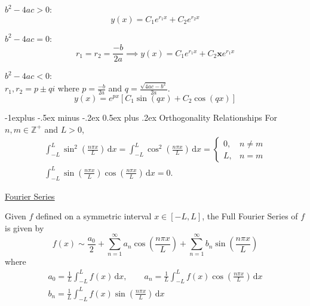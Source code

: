 \documentclass[10pt,landscape,letterpaper]{article}
\makeatletter
\renewcommand{\subsection}{\@startsection{subsection}{2}{0mm}%
                                {-1explus -.5ex minus -.2ex}%
                                {0.5ex plus .2ex}%
                                {\normalfont\normalsize\bfseries}}
\newcommand\cheatsheetmargin{0.2cm}
\makeatother
\begin{document}
\begin{multicols}{3}
\begin{description}[style=unboxed,leftmargin=\cheatsheetmargin]
    \item[Case 1.] $b^2 - 4ac > 0$:
    \begin{equation*}
    \boxed{y(x) = C_1 e^{r_1 x} + C_2 e^{r_2 x}}
    \end{equation*}
    \item[Case 2.] $b^2 - 4ac =0$:\\
    \begin{equation*}
    r_1 = r_2 = \frac{-b}{2a} \implies \boxed{y(x) = C_1 e^{r_1 x} + C_2 \mathbf{x}e^{r_1 x}}
    \end{equation*}
    \item[Case 3.] $b^2 - 4ac < 0$:\\
    $r_1, r_2 = p \pm qi$ where $p = \frac{-b}{2a}$ and $q = \frac{\sqrt{4ac - b^2 }}{2a}$. 
    \begin{equation*}
    \boxed{
        y(x) = e^{px} \left[C_1 \sin \left(qx\right) + C_2 \cos \left(qx\right) \right]
    }
    \end{equation*}
\end{description}

\subsection{Orthogonality Relationships}
For $n,m \in \mathbb{Z}^+$ and $L>0$,
\begin{gather*}
     \int_{-L}^{L} \sin^2 \left(\frac{n\pi x}{L}\right)\, \mathrm{d} x 
     = \int_{-L}^{L} \cos^2 \left(\frac{n\pi x}{L}\right)\, \mathrm{d} x = \begin{cases}
         0, & n \neq m\\
         L, & n = m
     \end{cases}\\
      \int_{-L}^{L} \sin \left(\frac{n\pi x}{L}\right) \cos \left(\frac{n\pi x}{L}\right) \, \mathrm{d} x = 0.
\end{gather*}


\begin{center}
    \Large{\underline{Fourier Series}} \\
\end{center}
Given $f$ defined on a symmetric interval $x\in[-L, L]$, the Full Fourier Series of $f$ is given by
\begin{equation*}\boxed{
f(x) \sim \frac{a_0}{2} + \sum_{n=1}^{\infty} a_n \cos \left(\frac{n\pi x}{L}\right) + \sum_{n=1}^{\infty} b_n \sin \left(\frac{n\pi x}{L}\right)}
\end{equation*}
where
\begin{gather*}
a_0 = \frac{1}{L}\int_{-L}^{L} f(x) \, \mathrm{d}x, \qquad 
a_n = \frac{1}{L}\int_{-L}^{L} f(x) \cos \left(\frac{n\pi x}{L}\right)\, \mathrm{d}x \\
b_n = \frac{1}{L}\int_{-L}^{L} f(x) \sin \left(\frac{n\pi x}{L}\right)\, \mathrm{d}x
\end{gather*}


\end{multicols}
\end{document}
